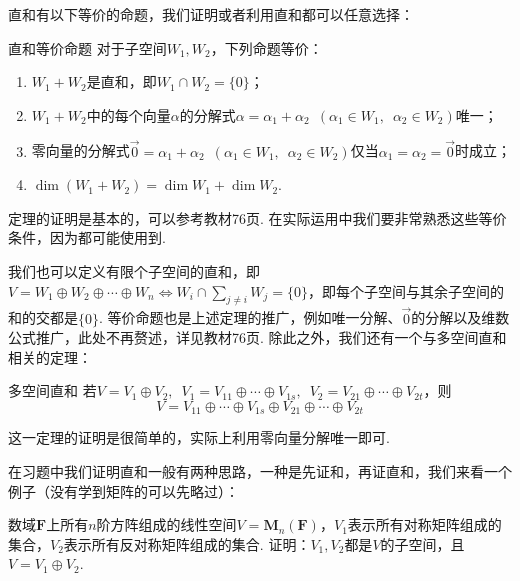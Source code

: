 直和有以下等价的命题，我们证明或者利用直和都可以任意选择：
\begin{theorem}{}{直和等价命题}
    对于子空间$W_1,W_2$，下列命题等价：
    \begin{enumerate}
        \item $W_1+W_2$是直和，即$W_1 \cap W_2=\{0\}$；

        \item $W_1+W_2$中的每个向量$\alpha$的分解式$\alpha=\alpha_1+\alpha_2\enspace(\alpha_1\in W_1,\enspace\alpha_2\in W_2)$唯一；

        \item 零向量的分解式$\vec{0}=\alpha_1+\alpha_2 \enspace(\alpha_1\in W_1,\enspace\alpha_2\in W_2)$仅当$\alpha_1=\alpha_2=\vec{0}$时成立；

        \item $\dim (W_1+W_2)=\dim W_1+\dim W_2$.
    \end{enumerate}
\end{theorem}

定理的证明是基本的，可以参考教材76页. 在实际运用中我们要非常熟悉这些等价条件，因为都可能使用到.

我们也可以定义有限个子空间的直和，即$V=W_1\oplus W_2\oplus\cdots\oplus W_n \iff W_i \cap \sum\limits_{j \neq i}W_j=\{0\}$，即每个子空间与其余子空间的和的交都是$\{0\}$. 等价命题也是上述定理的推广，例如唯一分解、$\vec{0}$的分解以及维数公式推广，此处不再赘述，详见教材76页. 除此之外，我们还有一个与多空间直和相关的定理：
\begin{theorem}{}{多空间直和}
    若$V=V_1\oplus V_2,\enspace V_1=V_{11}\oplus\cdots\oplus V_{1s},\enspace V_2=V_{21}\oplus\cdots\oplus V_{2t}$，则
    \[V=V_{11}\oplus\cdots\oplus V_{1s}\oplus V_{21}\oplus\cdots\oplus V_{2t}\]
\end{theorem}
这一定理的证明是很简单的，实际上利用零向量分解唯一即可.

在习题中我们证明直和一般有两种思路，一种是先证和，再证直和，我们来看一个例子（没有学到矩阵的可以先略过）：
\begin{example}{}{}
    数域$\mathbf{F}$上所有$n$阶方阵组成的线性空间$V=\mathbf{M}_n(\mathbf{F})$，$V_1$表示所有对称矩阵组成的集合，$V_2$表示所有反对称矩阵组成的集合. 证明：$V_1,V_2$都是$V$的子空间，且$V=V_1\oplus V_2$.
\end{example}

